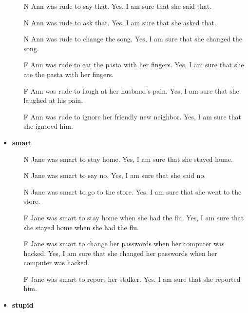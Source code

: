 \documentclass[11pt,fleqn]{article}
\newcommand{\6}{\mbox{$[\hspace*{-.6mm}[$}}
\newcommand{\9}{\mbox{$]\hspace*{-.6mm}]$}}
\begin{document}
\begin{itemize}[leftmargin=10pt,itemsep=-1pt]
\begin{enumerate}[leftmargin=10pt,topsep=0pt,itemsep=0pt]
\item[N]  	Ann was rude to say that.	Yes, I am sure that she said that.
\item[N]  	Ann was rude to ask that.	Yes, I am sure that she asked that.
\item[N]  	Ann was rude to change the song.	Yes, I am sure that she changed the song.
\item[F]  	Ann was rude to eat the pasta with her fingers.	Yes, I am sure that she ate the pasta with her fingers.
\item[F]  	Ann was rude to laugh at her husband's pain.	Yes, I am sure that she laughed at his pain.
\item[F]  	Ann was rude to ignore her friendly new neighbor.	Yes, I am sure that she ignored him.

\end{enumerate}

\item {\bf smart}

\begin{enumerate}[leftmargin=10pt,topsep=0pt,itemsep=0pt]

\item[N]  	Jane was smart to stay home.	Yes, I am sure that she stayed home.
\item[N]  	Jane was smart to say no.	Yes, I am sure that she said no.
\item[N]  	Jane was smart to go to the store.	Yes, I am sure that she went to the store.
\item[F]  	Jane was smart to stay home when she had the flu.	Yes, I am sure that she stayed home when she had the flu.
\item[F]  	Jane was smart to change her passwords when her computer was hacked.	Yes, I am sure that she changed her passwords when her computer was hacked.
\item[F]  	Jane was smart to report her stalker.	Yes, I am sure that she reported him.

\end{enumerate}

\item {\bf stupid}

\begin{enumerate}[leftmargin=10pt,topsep=0pt,itemsep=0pt]


\end{enumerate}
\end{itemize}
\end{document}
